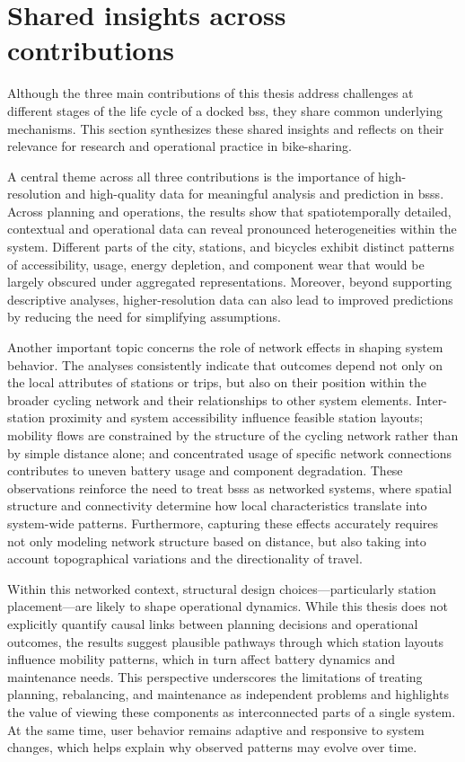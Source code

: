 \section{Shared insights across contributions}
\label{sec:disc_shared_insights}

Although the three main contributions of this thesis address challenges at different stages of the life cycle of a docked \ac{bss}, they share common underlying mechanisms. This section synthesizes these shared insights and reflects on their relevance for research and operational practice in bike-sharing.

A central theme across all three contributions is the importance of high-resolution and high-quality data for meaningful analysis and prediction in \acp{bss}. Across planning and operations, the results show that spatiotemporally detailed, contextual and operational data can reveal pronounced heterogeneities within the system. Different parts of the city, stations, and bicycles exhibit distinct patterns of accessibility, usage, energy depletion, and component wear that would be largely obscured under aggregated representations. Moreover, beyond supporting descriptive analyses, higher-resolution data can also lead to improved predictions by reducing the need for simplifying assumptions.

Another important topic concerns the role of network effects in shaping system behavior. The analyses consistently indicate that outcomes depend not only on the local attributes of stations or trips, but also on their position within the broader cycling network and their relationships to other system elements. Inter-station proximity and system accessibility influence feasible station layouts; mobility flows are constrained by the structure of the cycling network rather than by simple distance alone; and concentrated usage of specific network connections contributes to uneven battery usage and component degradation. These observations reinforce the need to treat \acp{bss} as networked systems, where spatial structure and connectivity determine how local characteristics translate into system-wide patterns. Furthermore, capturing these effects accurately requires not only modeling network structure based on distance, but also taking into account topographical variations and the directionality of travel.

Within this networked context, structural design choices—particularly station placement—are likely to shape operational dynamics. While this thesis does not explicitly quantify causal links between planning decisions and operational outcomes, the results suggest plausible pathways through which station layouts influence mobility patterns, which in turn affect battery dynamics and maintenance needs. This perspective underscores the limitations of treating planning, rebalancing, and maintenance as independent problems and highlights the value of viewing these components as interconnected parts of a single system. At the same time, user behavior remains adaptive and responsive to system changes, which helps explain why observed patterns may evolve over time.


